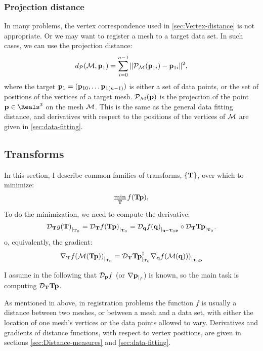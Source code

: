 \subsubsection{Projection distance}
\label{sec:Projection-distance}

In many problems, the vertex correspondence used in
\autoref{sec:Vertex-distance} is not appropriate.
Or we may want to register a mesh to a target data set.
In such cases, we can use the projection distance:
\begin{equation}
d_{{\mathcal P}}({\mathcal M},{\mathbf p}_1) = \sum_{i=0}^{n-1} \| {\mathcal P}_{{\mathcal M}}({\mathbf p}_{1i}) - {\mathbf p}_{1i} \|^2,
\end{equation}
where the target ${\mathbf p}_1 = ({\mathbf p}_{10}, \ldots {\mathbf p}_{1(n-1)})$
is either a set of data points,
or the set of positions of the vertices of a target mesh.
${\mathcal P}_{{\mathcal M}}({\mathbf p})$ is the projection of the point $\p \in \Reals^3$
on the mesh ${\mathcal M}$.
This is the same as the general data fitting distance, and
derivatives with respect to the positions of the vertices
of ${\mathcal M}$ are given in \autoref{sec:data-fitting}.

\subsection{Transforms}
\label{sec:Transforms}

In this section, I describe common families
of transforms, $\{{\mathbf T}\}$, over which to minimize:
\begin{equation}
\min_{{\mathbf T}} f( {\mathbf T} {\mathbf p}),
\end{equation}
To do the minimization, we need to compute
the derivative:
\begin{equation}
{\mathcal D}_{{\mathbf T}}{g({\mathbf T})}_{\mid_{{\mathbf T}_0}}
= {\mathcal D}_{{\mathbf T}}{f({\mathbf T}{\mathbf p})}_{\mid_{{\mathbf T}_0}}
= {\mathcal D}_{{\mathbf q}}{f({\mathbf q})}_{\mid_{{\mathbf q}={\mathbf T}_0{\mathbf p}}}
\circ
{\mathcal D}_{{\mathbf T}}{{\mathbf T}{\mathbf p}}_{\mid_{{\mathbf T}_0}}.
\end{equation}
o, equivalently, the gradient:
\begin{equation}
{\mathbf \nabla}_{{\mathbf T}}{{f( {\mathcal M}({\mathbf T}{\mathbf p}) )}}_{\mid_{{\mathbf T}_0}}
 =
{\mathcal D}_{{\mathbf T}}{{\mathbf T}{\mathbf p}}_{\mid_{{\mathbf T}_0}}^\dagger
{\mathbf \nabla}_{{\mathbf q}}{{f({\mathcal M}({\mathbf q})))}}_{\mid_{{\mathbf T}_0{\mathbf p}}}
\end{equation}

I assume in the following
that ${\mathcal D}_{{\mathbf p}}{f}$ (or ${\mathbf \nabla}{{\mathbf p}}_{\mid_{f}}$) is known,
so the main task is computing ${\mathcal D}_{{\mathbf T}}{{\mathbf T}{\mathbf p}}$.

As mentioned in above,
in registration problems
the function $f$ is usually a distance between
two meshes, or between a mesh and a data set,
with either the location of one mesh's vertices
or the data points allowed to vary.
Derivatives and gradients of distance functions,
with respect to vertex positions,
are given in sections \ref{sec:Distance-measures}
and \ref{sec:data-fitting}.

